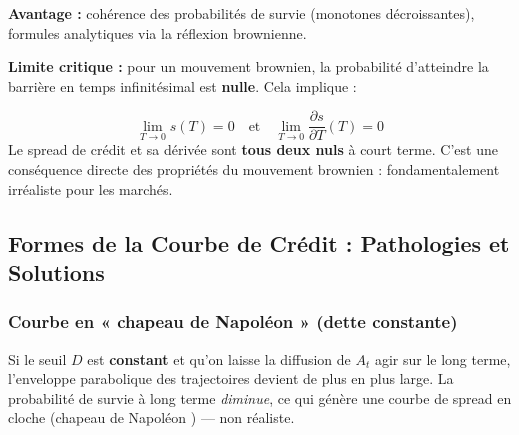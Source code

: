 \textbf{Avantage :} cohérence des probabilités de survie (monotones décroissantes), formules analytiques via la réflexion brownienne.

\textbf{Limite critique :} pour un mouvement brownien, la probabilité d'atteindre la barrière en temps infinitésimal est \textbf{nulle}. Cela implique :

\begin{tcolorbox}[colback=red!5,colframe=red!60,title=Problème du spread nul à court terme]
\[
\lim_{T \to 0} s(T) = 0 \quad \text{et} \quad \lim_{T \to 0} \frac{\partial s}{\partial T}(T) = 0
\]
Le spread de crédit et sa dérivée sont \textbf{tous deux nuls} à court terme. C'est une conséquence directe des propriétés du mouvement brownien : fondamentalement irréaliste pour les marchés.
\end{tcolorbox}

\subsection{Formes de la Courbe de Crédit : Pathologies et Solutions}

\subsubsection{Courbe en « chapeau de Napoléon » (dette constante)}

Si le seuil $D$ est \textbf{constant} et qu'on laisse la diffusion de $A_t$ agir sur le long terme, l'enveloppe parabolique des trajectoires devient de plus en plus large. La probabilité de survie à long terme \textit{diminue}, ce qui génère une courbe de spread en cloche (\og chapeau de Napoléon \fg) — non réaliste.

\begin{center}
\end{center}

